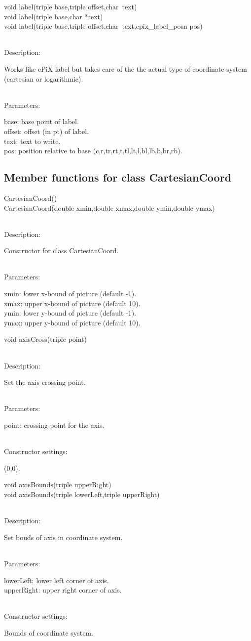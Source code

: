 \documentclass[12pt,a4paper]{article}
\newcommand{\memberitem}[1]{
                              \vspace{-0.5pc}
                              \end{minipage}\\
                              \phantom{M}#1:\\
                              \phantom{MM}
                              \begin{minipage}[t]{12cm}

                           }
\newcommand{\memdsc}{\memberitem{Description}}
\newcommand{\meminp}{\memberitem{Parameters}}
\newcommand{\memdef}{\memberitem{Constructor settings}}
\newenvironment{MemberDescr}
  {
    \begin{minipage}{15cm}
    \bf
  }
  {
    \end{minipage}
  }
\newcommand{\pntr}{\raisebox{-0.25em}{*}\ }
\begin{document}
  \begin{MemberDescr}
    void label(triple base,triple offset,char\pntr text)\\
    void label(triple base,char *text)\\
    void label(triple base,triple offset,char\pntr text,epix\_label\_posn pos)\\
    \memdsc
      Works like ePiX label but takes care of the the actual type of
      coordinate system (cartesian or logarithmic).\\
    \meminp
      base:   base point of label.\\
      offset: offset (in pt) of label.\\
      text:   text to write.\\
      pos:    position relative to base (c,r,tr,rt,t,tl,lt,l,bl,lb,b,br,rb).\\
  \end{MemberDescr}


  \subsection{Member functions for class CartesianCoord}

  \begin{MemberDescr}
    CartesianCoord()\\
    CartesianCoord(double xmin,double xmax,double ymin,double ymax)\\
    \memdsc
      Constructor for class CartesianCoord.\\
    \meminp
      xmin: lower x-bound of picture (default -1).\\
      xmax: upper x-bound of picture (default 10).\\
      ymin: lower y-bound of picture (default -1).\\
      ymax: upper y-bound of picture (default 10).\\
  \end{MemberDescr}

  \begin{MemberDescr}
    void axisCross(triple point)\\
    \memdsc
      Set the axis crossing point.\\
    \meminp
      point: crossing point for the axis.\\
    \memdef
      (0,0).\\
  \end{MemberDescr}

  \begin{MemberDescr}
    void axisBounds(triple upperRight)\\
    void axisBounds(triple lowerLeft,triple upperRight)\\
    \memdsc
      Set bouds of axis in coordinate system.\\
    \meminp
      lowerLeft:  lower left corner of axis.\\
      upperRight: upper right corner of axis.\\
    \memdef
      Bounds of coordinate system.\\
  \end{MemberDescr}
\end{document}
